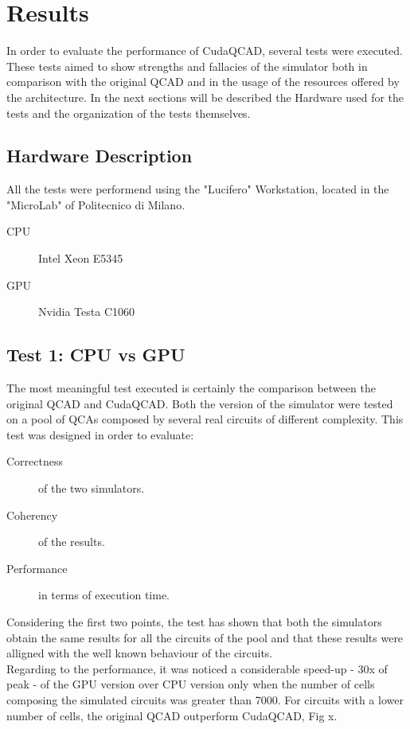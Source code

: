 \chapter{Results}\label{sec:results}
In order to evaluate the performance of CudaQCAD, several tests were executed. These tests aimed to show strengths and fallacies of the simulator both in comparison with the original QCAD and in the usage of the resources offered by the architecture. In the next sections will be described the Hardware used for the tests and the organization of the tests themselves.

\section{Hardware Description}
All the tests were performend using the "Lucifero" Workstation, located in the "MicroLab" of Politecnico di Milano. \\
\begin{description}
\item[CPU] Intel Xeon E5345
\item[GPU] Nvidia Testa C1060
\end{description} 

\section{Test 1: CPU vs GPU}
The most meaningful test executed is certainly the comparison between the original QCAD and CudaQCAD. Both the version of the simulator were tested on a pool of QCAs composed by several real circuits of different complexity. This test was designed in order to evaluate:

\begin{description}
\item[Correctness] of the two simulators.
\item[Coherency] of the results.
\item[Performance] in terms of execution time.
\end{description}    

Considering the first two points, the test has shown that both the simulators obtain the same results for all the circuits of the pool and that these results were alligned with the well known behaviour of the circuits.\\
Regarding to the performance, it was noticed a considerable speed-up - 30x of peak - of the GPU version over CPU version only when the number of cells composing the simulated circuits was greater than 7000. For circuits with a lower number of cells, the original QCAD outperform CudaQCAD, Fig x.
 
